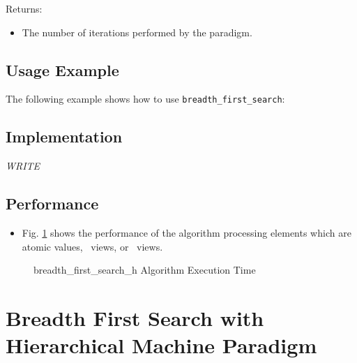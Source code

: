 Returns:
\begin{itemize}
\item
The number of iterations performed by the paradigm. 
\end{itemize}

\subsection{Usage Example} \label{sec-br-first-hmach-alg-use}

The following example shows how to use 
\texttt{breadth\_first\_search}:
 

\subsection{Implementation} \label{sec-br-first-hmach-alg-impl}

\textit{WRITE}

\subsection{Performance} \label{sec-br-first-hmach-alg-perf}

\begin{itemize}
\item
Fig. \ref{fig:br-first-hmach-alg-exec-exper}
shows the performance of the algorithm processing
elements which are atomic values, \stl\ views, or \stapl\ views.
\end{itemize}

\begin{figure}[p]
\caption{breadth\_first\_search\_h Algorithm Execution Time}
\label{fig:br-first-hmach-alg-exec-exper}
\end{figure}


\section{ Breadth First Search with Hierarchical Machine Paradigm} 
\label{sec-br-first-hmach-hubs-alg}

